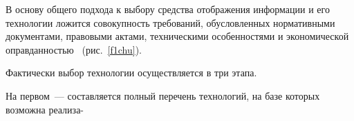 \begin{multicols}{2}
В основу общего подхода к выбору средства отоб\-ра\-же\-ния информации и 
его технологии ложится совокупность требований, обусловленных 
нормативными документами, правовыми актами, техническими 
особенностями и экономической оправданностью~\cite{10chu} 
(рис.~\ref{f1chu}).

     Фактически выбор технологии осуществляется в три этапа.


     На первом~--- составляется полный перечень технологий, на базе 
которых возможна реализа-\linebreak\vspace*{-12pt}
\pagebreak

\end{multicols}
   

\begin{figure} %
\vspace*{1pt}
\begin{center}
\mbox{%
\epsfxsize=164.754mm
}
\end{center}
\vspace*{-6pt}
\vspace*{6pt}
\end{figure}

